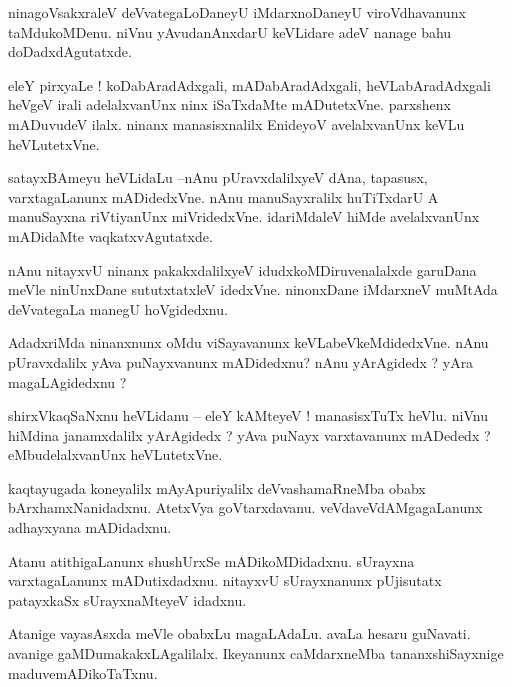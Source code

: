 \documentclass{article}
\begin{document}
\begin{mn}%
ninagoVsakxraleV deVvategaLoDaneyU iMdarxnoDaneyU viroVdhavanunx taMdukoMDenu. niVnu yAvudanAnxdarU 
keVLidare adeV nanage bahu doDadxdAgutatxde.
\end{mn}

\begin{mn}%
eleY pirxyaLe ! koDabAradAdxgali, mADabAradAdxgali, heVLabAradAdxgali heVgeV irali adelalxvanUnx 
ninx iSaTxdaMte mADutetxVne. parxshenx mADuvudeV ilalx. ninanx manasisxnalilx EnideyoV 
avelalxvanUnx keVLu heVLutetxVne.
\end{mn}

\begin{mn}%
satayxBAmeyu heVLidaLu --nAnu pUravxdalilxyeV dAna, tapasusx, varxtagaLanunx mADidedxVne. nAnu 
manuSayxralilx huTiTxdarU A manuSayxna riVtiyanUnx miVridedxVne. idariMdaleV hiMde avelalxvanUnx 
mADidaMte vaqkatxvAgutatxde.
\end{mn}

\begin{mn}%
nAnu nitayxvU ninanx pakakxdalilxyeV idudxkoMDiruvenalalxde garuDana meVle ninUnxDane sututxtatxleV 
idedxVne. ninonxDane iMdarxneV muMtAda deVvategaLa manegU hoVgidedxnu.
\end{mn}

\begin{mn}%
AdadxriMda ninanxnunx oMdu viSayavanunx keVLabeVkeMdidedxVne. nAnu pUravxdalilx yAva puNayxvanunx 
mADidedxnu? nAnu yArAgidedx ? yAra magaLAgidedxnu ? 
\end{mn}

\begin{mn}%
shirxVkaqSaNxnu heVLidanu -- eleY kAMteyeV ! manasisxTuTx heVlu. niVnu hiMdina janamxdalilx 
yArAgidedx ? yAva puNayx varxtavanunx mADededx ? eMbudelalxvanUnx heVLutetxVne.
\end{mn}

\begin{mn}%
kaqtayugada koneyalilx mAyApuriyalilx deVvashamaRneMba obabx bArxhamxNanidadxnu. AtetxVya 
goVtarxdavanu. veVdaveVdAMgagaLanunx adhayxyana mADidadxnu.
\end{mn}

\begin{mn}%
Atanu atithigaLanunx shushUrxSe mADikoMDidadxnu. sUrayxna varxtagaLanunx mADutixdadxnu. nitayxvU 
sUrayxnanunx pUjisutatx patayxkaSx sUrayxnaMteyeV idadxnu.
\end{mn}

\begin{mn}%
Atanige vayasAsxda meVle obabxLu magaLAdaLu. avaLa hesaru guNavati. avanige gaMDumakakxLAgalilalx. 
Ikeyanunx caMdarxneMba tananxshiSayxnige maduvemADikoTaTxnu.
\end{mn}
\end{document}
